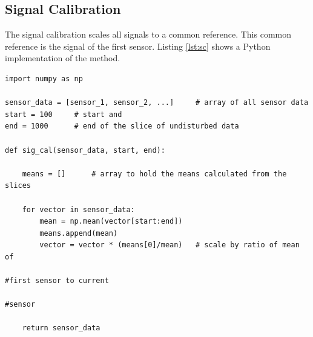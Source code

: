 \subsection*{Signal Calibration} \label{sc}

The signal calibration scales all signals to a common reference. This common reference is the signal of the first sensor. Listing \ref{lst:sc} shows a Python implementation of the method.

\begin{lstlisting}[caption={Python implementation the signal calibration.},label={lst:sc}]
import numpy as np

sensor_data = [sensor_1, sensor_2, ...]		# array of all sensor data
start = 100		# start and
end = 1000		# end of the slice of undisturbed data

def sig_cal(sensor_data, start, end):

    means = []		# array to hold the means calculated from the slices

    for vector in sensor_data:
        mean = np.mean(vector[start:end])
        means.append(mean)	
        vector = vector * (means[0]/mean) 	# scale by ratio of mean of 
        																			#first sensor to current
        																			#sensor

    return sensor_data
    
\end{lstlisting}